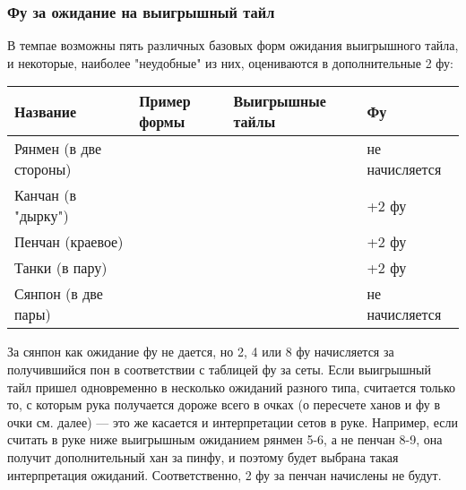 \subsubsection{Фу за ожидание на выигрышный тайл}

В темпае возможны пять различных базовых форм ожидания выигрышного тайла, и некоторые, наиболее "неудобные" из них, оцениваются в дополнительные 2 фу:

\noindent\begin{tabular}{C{3cm}C{5cm}C{3cm}C{3cm}}
\toprule
	Название  &
	Пример формы &
	Выигрышные тайлы &
	Фу \\
\midrule
	\rule[0ex]{0pt}{5ex} Рянмен \newline (в две стороны) \newline &
	 &
	 &
	не начисляется \\
\midrule
	\rule[0ex]{0pt}{5ex} Канчан \newline (в "дырку") \newline &
	 &
	 &
	+2 фу \\
\midrule
	\rule[0ex]{0pt}{5ex} Пенчан \newline (краевое) \newline &
	 &
	 &
	+2 фу \\
\midrule
	\rule[0ex]{0pt}{5ex} Танки \newline (в пару) \newline &
	 &
	 &
	+2 фу \\
\midrule
	\rule[0ex]{0pt}{5ex} Сянпон \newline (в две пары) \newline &
	  &
	 &
	не начисляется \\
\bottomrule
\end{tabular}

За сянпон как ожидание фу не дается, но 2, 4 или 8 фу начисляется за получившийся пон в соответствии с таблицей фу за сеты. Если выигрышный тайл пришел одновременно в несколько ожиданий разного типа, считается только то, с которым рука получается дороже всего в очках (о пересчете ханов и фу в очки см. далее) --- это же касается и интерпретации сетов в руке. Например, если считать в руке ниже выигрышным ожиданием рянмен 5-6, а не пенчан 8-9, она получит дополнительный хан за  пинфу,  и поэтому будет выбрана такая интерпретация ожиданий. Соответственно, 2 фу за пенчан начислены не будут.


